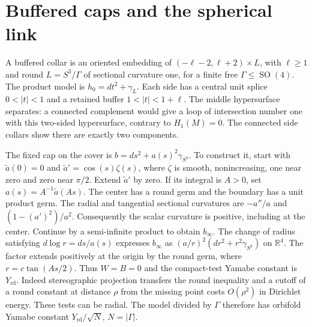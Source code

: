 \documentclass[11pt]{article}
\numberwithin{equation}{section}
\theoremstyle{definition}
\theoremstyle{remark}
\newcommand{\R}{\mathbb R}
\newcommand{\SO}{\operatorname{SO}}
\newcommand{\Yrd}{Y_{\mathrm{rd}}}
\begin{document}
\section{Buffered caps and the spherical link}

A buffered collar is an oriented embedding of
\(( -\ell-2,\ell+2)\times L\), with \(\ell\ge1\) and round
\(L=S^3/\Gamma\) of sectional curvature one, for a finite free
\(\Gamma\le\SO(4)\). The product model is \(h_0=dt^2+\gamma_L\).
Each side has a central unit splice \(0<|t|<1\) and a retained
buffer \(1<|t|<1+\ell\). The middle hypersurface separates:
a connected complement would give a loop of intersection number
one with this two-sided hypersurface, contrary to \(H_1(M)=0\).
The connected side collars show there are exactly two components.

The fixed cap on the cover is \(b=ds^2+a(s)^2\gamma_{S^3}\).
To construct it, start with \(\widetilde a(0)=0\) and
\(\widetilde a'=\cos(s)\zeta(s)\), where \(\zeta\) is smooth,
nonincreasing, one near zero and zero near \(\pi/2\). Extend
\(\widetilde a'\) by zero. If its integral is \(A>0\), set
\(a(s)=A^{-1}\widetilde a(As)\). The center has a round germ
and the boundary has a unit product germ. The radial and
tangential sectional curvatures are \(-a''/a\) and
\((1-(a')^2)/a^2\). Consequently the scalar curvature is
positive, including at the center. Continue by a semi-infinite
product to obtain \(b_\infty\). The change of radius satisfying
\(d\log r=ds/a(s)\) expresses \(b_\infty\) as
\((a/r)^2(dr^2+r^2\gamma_{S^3})\) on \(\R^4\). The factor
extends positively at the origin by the round germ, where
\(r=c\tan(As/2)\). Thus \(W=B=0\) and the compact-test Yamabe
constant is \(\Yrd\). Indeed stereographic projection transfers
the round inequality and a cutoff of a round constant at distance
\(\rho\) from the missing point costs \(O(\rho^2)\) in Dirichlet
energy. These tests can be radial. The model divided by \(\Gamma\)
therefore has orbifold Yamabe constant \(\Yrd/\sqrt{N}\),
\(N=|\Gamma|\).
\end{document}
